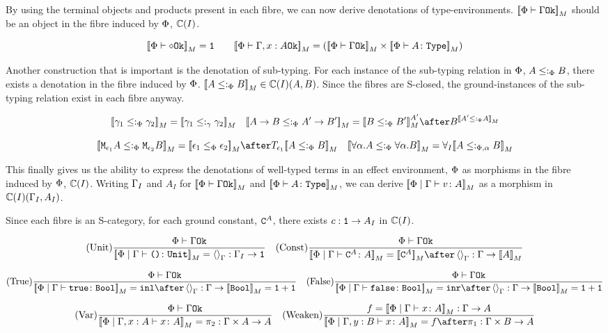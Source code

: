 \documentclass{Report}
\begin{document}
By using the terminal objects and products present in each fibre, we can now derive denotations of type-environments. $\deno{\oke{\P}{\G}}$ should be an object in the fibre induced by $\P$, $\C(I)$.

\[
    \deno{\wellformedok{\P}{\nil}} = \1
    \quad\quad
    \deno{\wellformedok{\P}{\gax}} = (\deno{\wellformedok{\P}{\G}} \times \deno{\typerelation{\P}{A}{\type}})
\]

Another construction that is important is the denotation of sub-typing. For each instance of the sub-typing relation in $\P$, $A\subtypep B$, there exists a denotation in the fibre induced by $\P$. $\deno{A\subtypep B} \in\C(I)(A, B)$. Since the fibres are S-closed, the ground-instances of the sub-typing relation exist in each fibre anyway.


\[
    \deno{\g_1\subtypep \g_2} = \deno{\g_1\subtypeg \g_2}
    \quad
    \deno{\ab \subtypep \fntype{A'}{B'}} = \deno{B\subtypep B'}^{A'}\after B^{\deno{A'\subtypep A}}
\]

\[
    \deno{\M{\e_1}{A}\subtypep\M{\e_2}{B}} = \deno{\e_1\subeffectp\e_2}\after\T{\e_1}{\deno{A\subtypep B}}
    \quad    
    \deno{\all{\a}{A}\subtypep\all{\a}{B}} = \allI{\deno{A\subtypepa B}}
\]

This finally gives us the ability to express the denotations of well-typed terms in an effect environment, $\P$ as morphisms in the fibre induced by $\P$, $\C(I)$.  Writing $\G_I$ and $A_I$ for $\deno{\wellformedok{\P}{\G}}$ and $\deno{\typerelation{\P}{A}{\type}}$, we can derive $\deno{\gpetyperelation{v}{A}}$ as a morphism in $\C(I)(\G_I, A_I)$.

Since each fibre is an S-category, for each ground constant, $\const{A}$, there exists $c: \1 \rightarrow A_I$ in $\C(I)$.

\[
    \treerule{Unit}{\wellformedok{\P}{\G}}{\deno{\etyperelation{\P}{\G}{\u}{\U}} = \term{\G} : \G_I \rightarrow \1}
    \quad
    \treerule{Const}{\wellformedok{\P}{\G}}{\deno{\etyperelation{\P}{\G}{\const{A}}{A}} = \deno{\const{A}} \after \term{\G} : \G \rightarrow \deno{A}}
\]

\[
    \treerule{True}{\wellformedok{\P}{\G}}{\deno{\etyperelation{\P}{\G}{\t}{\B}} = \inl \after \term{\G} : \G \rightarrow \deno{\B} = \1+\1}
    \quad
    \treerule{False}{\wellformedok{\P}{\G}}{\deno{\etyperelation{\P}{\G}{\f}{\B}} = \inr \after \term{\G} : \G \rightarrow \deno{\B} = \1+\1}
\]

\[
    \treerule{Var}{\wellformedok{\P}{\G}}{\deno{\etyperelation{\P}{\gax}{x}{A}} = \pp: \G \times A \rightarrow A}
    \quad    
    \treerule{Weaken}{f = \deno{\gpetyperelation{x}{A}}: \G \rightarrow A}{\deno{\etyperelation{\P}{\gby}{x}{A}} = f \after \p: \G \times B \rightarrow A}
\]
\end{document}
